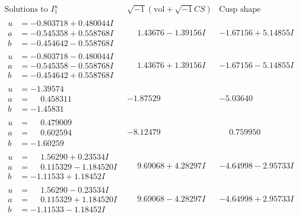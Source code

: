 \documentclass[1p]{elsarticle_modified}
\theoremstyle{definition}
\newcommand{\I}{\sqrt{-1}}
\begin{document}
$$\begin{array}{c|c|c}  
\text{Solutions to }I^u_{1}& \I (\text{vol} + \sqrt{-1}CS) & \text{Cusp shape}\\
 \hline 
\begin{aligned}
u &= -0.803718 + 0.480044 I \\
a &= -0.545358 + 0.558768 I \\
b &= -0.454642 - 0.558768 I\end{aligned}
 & \phantom{-}1.43676 - 1.39156 I & -1.67156 + 5.14855 I \\ \hline\begin{aligned}
u &= -0.803718 - 0.480044 I \\
a &= -0.545358 - 0.558768 I \\
b &= -0.454642 + 0.558768 I\end{aligned}
 & \phantom{-}1.43676 + 1.39156 I & -1.67156 - 5.14855 I \\ \hline\begin{aligned}
u &= -1.39574\phantom{ +0.000000I} \\
a &= \phantom{-}0.458311\phantom{ +0.000000I} \\
b &= -1.45831\phantom{ +0.000000I}\end{aligned}
 & -1.87529\phantom{ +0.000000I} & -5.03640\phantom{ +0.000000I} \\ \hline\begin{aligned}
u &= \phantom{-}0.479009\phantom{ +0.000000I} \\
a &= \phantom{-}0.602594\phantom{ +0.000000I} \\
b &= -1.60259\phantom{ +0.000000I}\end{aligned}
 & -8.12479\phantom{ +0.000000I} & \phantom{-}0.759950\phantom{ +0.000000I} \\ \hline\begin{aligned}
u &= \phantom{-}1.56290 + 0.23534 I \\
a &= \phantom{-}0.115329 - 1.184520 I \\
b &= -1.11533 + 1.18452 I\end{aligned}
 & \phantom{-}9.69068 + 4.28297 I & -4.64998 - 2.95733 I \\ \hline\begin{aligned}
u &= \phantom{-}1.56290 - 0.23534 I \\
a &= \phantom{-}0.115329 + 1.184520 I \\
b &= -1.11533 - 1.18452 I\end{aligned}
 & \phantom{-}9.69068 - 4.28297 I & -4.64998 + 2.95733 I \\ \hline\begin{aligned}

\end{aligned}
\end{array}$$
\end{document}
